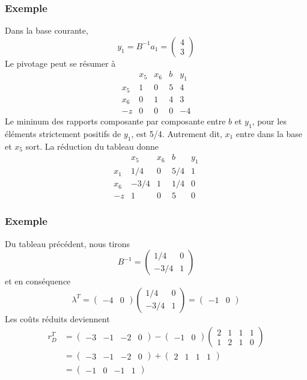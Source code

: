 \documentclass[usepdftitle=false]{beamer}
\begin{document}
\begin{frame}
\frametitle{Exemple}

Dans la base courante,
\[
y_1 = B^{-1}a_1 = \begin{pmatrix} 4 \\ 3 \end{pmatrix}
\]
Le pivotage peut se résumer à
\[
\begin{matrix}
    & x_5 & x_6 & b & y_1 \\
x_5 & 1 & 0 & 5 & 4 \\
x_6 & 0 & 1 & 4 & 3 \\
-z & 0 & 0 & 0 & -4
\end{matrix}
\]
Le mininum des rapports composante par composante entre $b$ et $y_1$, pour les éléments strictement positifs de $y_1$, est 5/4. Autrement dit, $x_1$ entre dans la base et $x_5$ sort.
La réduction du tableau donne
\[
\begin{matrix}
    & x_5 & x_6 & b & y_1 \\
x_1 & 1/4 & 0 & 5/4 & 1 \\
x_6 & -3/4 & 1 & 1/4 & 0 \\
-z & 1 & 0 & 5 & 0
\end{matrix}
\]

\end{frame}

\begin{frame}
\frametitle{Exemple}

Du tableau précédent, nous tirons
\[
B^{-1} =
\begin{pmatrix}
1/4 & 0 \\
-3/4 & 1
\end{pmatrix}
\]
et en conséquence
\[
\lambda^T = \begin{pmatrix} -4 & 0 \end{pmatrix}
\begin{pmatrix}
1/4 & 0 \\
-3/4 & 1
\end{pmatrix} =  
\begin{pmatrix} -1 & 0 \end{pmatrix}
\]
Les coûts réduits deviennent
\begin{align*}
r_D^T &=
\begin{pmatrix}
-3 & -1 & -2 & 0
\end{pmatrix}
-
\begin{pmatrix}
-1 & 0
\end{pmatrix}
\begin{pmatrix}
2 & 1 & 1 & 1 \\
1 & 2 & 1 & 0
\end{pmatrix} \\
&=
\begin{pmatrix}
-3 & -1 & -2 & 0
\end{pmatrix} +
\begin{pmatrix}
2 & 1 & 1 & 1
\end{pmatrix} \\
&=
\begin{pmatrix}
-1 & 0 & -1 & 1
\end{pmatrix}
\end{align*}

\end{frame}
\end{document}
